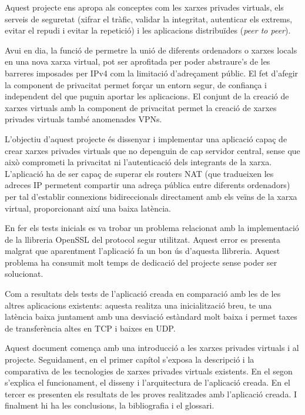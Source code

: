 \portada

\begin{resum}{3.7cm}
Aquest projecte ens apropa als conceptes com les xarxes privades virtuals, els serveis de seguretat (xifrar el tràfic, validar la integritat, autenticar els extrems, evitar el repudi i evitar la repetició) i les aplicacions distribuïdes (\emph{peer to peer}).

Avui en dia, la funció de permetre la unió de diferents ordenadors o xarxes locals en una nova xarxa virtual, pot ser aprofitada per poder abstraure's de les barreres imposades per IPv4 com la limitació d'adreçament públic. El fet d'afegir la component de privacitat permet forçar un entorn segur, de confiança i independent del que puguin aportar les aplicacions. El conjunt de la creació de xarxes virtuals amb la component de privacitat permet la creació de xarxes privades virtuals també anomenades VPNs.

L'objectiu d'aquest projecte és dissenyar i implementar una aplicació capaç de crear xarxes privades virtuals que no depenguin de cap servidor central, sense que això comprometi la privacitat ni l'autenticació dels integrants de la xarxa. L'aplicació ha de ser capaç de superar els routers NAT (que tradueixen les adreces IP permetent compartir una adreça pública entre diferents ordenadors) per tal d'establir connexions bidireccionals directament amb els veïns de la xarxa virtual, proporcionant així una baixa latència.

En fer els tests inicials es va trobar un problema relacionat amb la implementació de la llibreria OpenSSL del protocol segur utilitzat. Aquest error es presenta malgrat que aparentment l'aplicació fa un bon ús d'aquesta llibreria. Aquest problema ha consumit molt temps de dedicació del projecte sense poder ser solucionat.

Com a resultats dels tests de l'aplicació creada en comparació amb les de les altres aplicacions existents: aquesta realitza una inicialització breu, te una latència baixa juntament amb una desviació estàndard molt baixa i permet taxes de transferència altes en TCP i baixes en UDP.

Aquest document comença amb una introducció a les xarxes privades virtuals i al projecte.
Seguidament, en el primer capítol s'exposa la descripció i la comparativa de les tecnologies de xarxes privades virtuals existents.
En el segon s'explica el funcionament, el disseny i l'arquitectura de l'aplicació creada.
En el tercer es presenten els resultats de les proves realitzades amb l'aplicació creada.
I finalment hi ha les conclusions, la bibliografia i el glossari.
\end{resum}


